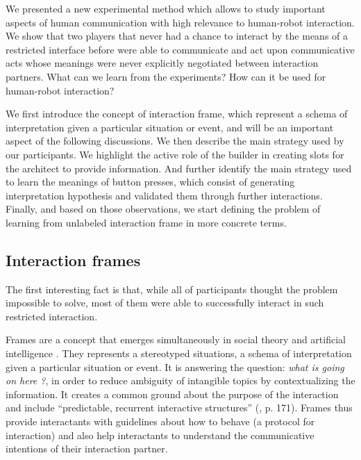 We presented a new experimental method which allows to study important aspects of human communication with high relevance to human-robot interaction. We show that two players that never had a chance to interact by the means of a restricted interface before were able to communicate and act upon communicative acts whose meanings were never explicitly negotiated between interaction partners. What can we learn from the experiments? How can it be used for human-robot interaction?

We first introduce the concept of interaction frame, which represent a schema of interpretation given a particular situation or event, and will be an important aspect of the following discussions. We then describe the main strategy used by our participants. We highlight the active role of the builder in creating slots for the architect to provide information. And further identify the main strategy used to learn the meanings of button presses, which consist of generating interpretation hypothesis and validated them through further interactions. Finally, and based on those observations, we start defining the problem of learning from unlabeled interaction frame in more concrete terms.

\subsection{Interaction frames}
\label{chapter:humanexperiment:frames}

The first interesting fact is that, while all of participants thought the problem impossible to solve, most of them were able to successfully interact in such restricted interaction.

Frames are a concept that emerges simultaneously in social theory \cite{goffman1974frame} and artificial intelligence \cite{minsky1974framework}. They represents a stereotyped situations, a schema of interpretation given a particular situation or event. It is answering the question: \emph{what is going on here ?},  in order to reduce ambiguity of intangible topics by contextualizing the information. It creates a common ground about the purpose of the interaction \cite{tomasello2009cultural,rohlfing2013learning} and include ``predictable, recurrent interactive structures'' (\cite{ninio1996pragmatic}, p. 171). Frames thus provide interactants with guidelines about how to behave (a protocol for interaction) and also help interactants to understand the communicative intentions of their interaction partner.

